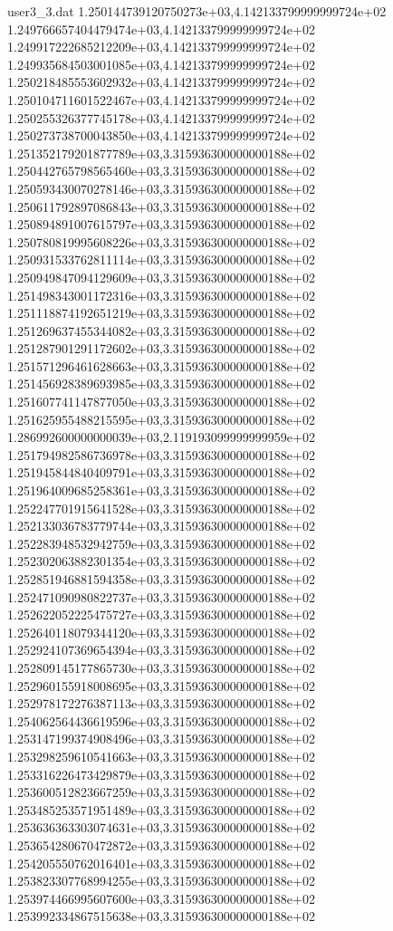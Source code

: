 \begin{filecontents}{user3_3.dat}
1.250144739120750273e+03,4.142133799999999724e+02
1.249766657404479474e+03,4.142133799999999724e+02
1.249917222685212209e+03,4.142133799999999724e+02
1.249935684503001085e+03,4.142133799999999724e+02
1.250218485553602932e+03,4.142133799999999724e+02
1.250104711601522467e+03,4.142133799999999724e+02
1.250255326377745178e+03,4.142133799999999724e+02
1.250273738700043850e+03,4.142133799999999724e+02
1.251352179201877789e+03,3.315936300000000188e+02
1.250442765798565460e+03,3.315936300000000188e+02
1.250593430070278146e+03,3.315936300000000188e+02
1.250611792897086843e+03,3.315936300000000188e+02
1.250894891007615797e+03,3.315936300000000188e+02
1.250780819995608226e+03,3.315936300000000188e+02
1.250931533762811114e+03,3.315936300000000188e+02
1.250949847094129609e+03,3.315936300000000188e+02
1.251498343001172316e+03,3.315936300000000188e+02
1.251118874192651219e+03,3.315936300000000188e+02
1.251269637455344082e+03,3.315936300000000188e+02
1.251287901291172602e+03,3.315936300000000188e+02
1.251571296461628663e+03,3.315936300000000188e+02
1.251456928389693985e+03,3.315936300000000188e+02
1.251607741147877050e+03,3.315936300000000188e+02
1.251625955488215595e+03,3.315936300000000188e+02
1.286992600000000039e+03,2.119193099999999959e+02
1.251794982586736978e+03,3.315936300000000188e+02
1.251945844840409791e+03,3.315936300000000188e+02
1.251964009685258361e+03,3.315936300000000188e+02
1.252247701915641528e+03,3.315936300000000188e+02
1.252133036783779744e+03,3.315936300000000188e+02
1.252283948532942759e+03,3.315936300000000188e+02
1.252302063882301354e+03,3.315936300000000188e+02
1.252851946881594358e+03,3.315936300000000188e+02
1.252471090980822737e+03,3.315936300000000188e+02
1.252622052225475727e+03,3.315936300000000188e+02
1.252640118079344120e+03,3.315936300000000188e+02
1.252924107369654394e+03,3.315936300000000188e+02
1.252809145177865730e+03,3.315936300000000188e+02
1.252960155918008695e+03,3.315936300000000188e+02
1.252978172276387113e+03,3.315936300000000188e+02
1.254062564436619596e+03,3.315936300000000188e+02
1.253147199374908496e+03,3.315936300000000188e+02
1.253298259610541663e+03,3.315936300000000188e+02
1.253316226473429879e+03,3.315936300000000188e+02
1.253600512823667259e+03,3.315936300000000188e+02
1.253485253571951489e+03,3.315936300000000188e+02
1.253636363303074631e+03,3.315936300000000188e+02
1.253654280670472872e+03,3.315936300000000188e+02
1.254205550762016401e+03,3.315936300000000188e+02
1.253823307768994255e+03,3.315936300000000188e+02
1.253974466995607600e+03,3.315936300000000188e+02
1.253992334867515638e+03,3.315936300000000188e+02

\end{filecontents}
